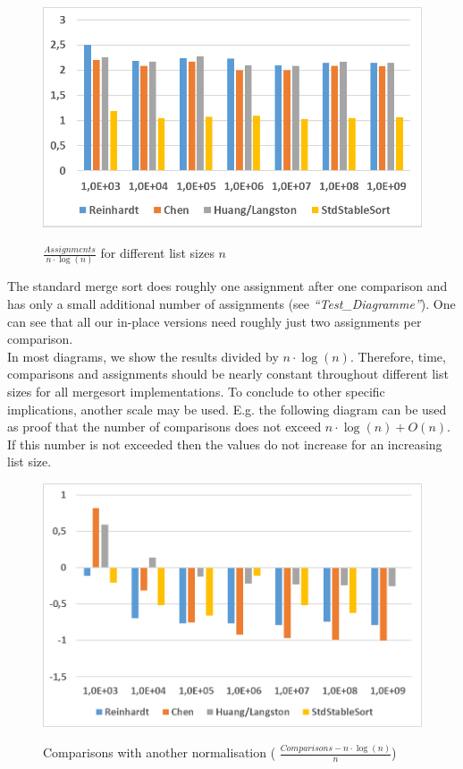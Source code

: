 \documentclass[11pt,pdftex,a4paper, twocolumn]{article}
\begin{document}
\begin{figure}[H]
\includegraphics[width=\linewidth]{Diagramm-Bilder/ints-assignments.JPG} \\
\caption{ $ \frac{Assignments}{n \cdot \log(n)} $ for different list sizes $ n $ } \label{fig:ints-assign}
\end{figure}
The standard merge sort does roughly one assignment after one comparison and has only a small additional number of assignments (see \textit{“Test\_Diagramme”}). One can see that all our in-place versions need roughly just two assignments per comparison. \\
In most diagrams, we show the results divided by $ n \cdot \log(n) $. Therefore, time, comparisons and assignments should be nearly constant throughout different list sizes for all mergesort implementations. To conclude to other specific implications, another scale may be used. E.g. the following diagram can be used as proof that the number of comparisons does not exceed $ n \cdot \log(n) + O(n) $. If this number is not exceeded then the values do not increase for an increasing list size. \\
\begin{figure}[H]
\includegraphics[width=\linewidth]{Diagramm-Bilder/ints-time-otherNormalization.JPG} \\
\caption{Comparisons with another normalisation ( $ \frac{Comparisons - n \cdot \log(n)}{n} $)} \label{fig:ints-time-otherNormalization}
\end{figure}
\end{document}
